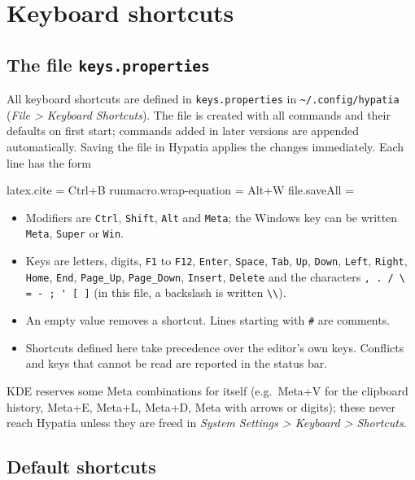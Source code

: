 \documentclass[11pt]{article}
\newcommand{\key}[1]{\textsf{#1}}
\newcommand{\menu}[1]{\textsf{\textit{#1}}}
\newcommand{\file}[1]{\texttt{#1}}
\newcommand{\cfgdir}{\texttt{\textasciitilde/.config/hypatia}}
\begin{document}
    \section{Keyboard shortcuts}\label{sec:keys}

    \subsection{The file \file{keys.properties}}

    All keyboard shortcuts are defined in \file{keys.properties} in \cfgdir{} (\menu{File > Keyboard Shortcuts}). The file is created with all commands and their defaults on first start; commands added in later versions are appended automatically. Saving the file in Hypatia applies the changes immediately. Each line has the form
    \begin{Code}
latex.cite = Ctrl+B
runmacro.wrap-equation = Alt+W
file.saveAll =
    \end{Code}
    \begin{itemize}
        \itemsep-1mm
        \item Modifiers are \verb+Ctrl+, \verb+Shift+, \verb+Alt+ and \verb+Meta+; the Windows key can be written \verb+Meta+, \verb+Super+ or \verb+Win+.
        \item Keys are letters, digits, \verb+F1+ to \verb+F12+, \verb+Enter+, \verb+Space+, \verb+Tab+, \verb+Up+, \verb+Down+, \verb+Left+, \verb+Right+, \verb+Home+, \verb+End+, \verb+Page_Up+, \verb+Page_Down+, \verb+Insert+, \verb+Delete+ and the characters \verb+, . / \ = - ; ' [ ]+ (in this file, a backslash is written \verb+\\+).
        \item An empty value removes a shortcut. Lines starting with \verb+#+ are comments.
        \item Shortcuts defined here take precedence over the editor's own keys. Conflicts and keys that cannot be read are reported in the status bar.
    \end{itemize}
    KDE reserves some \key{Meta} combinations for itself (e.g.\ \key{Meta+V} for the clipboard history, \key{Meta+E}, \key{Meta+L}, \key{Meta+D}, \key{Meta} with arrows or digits); these never reach Hypatia unless they are freed in \menu{System Settings > Keyboard > Shortcuts}.

    \subsection{Default shortcuts}
\end{document}

